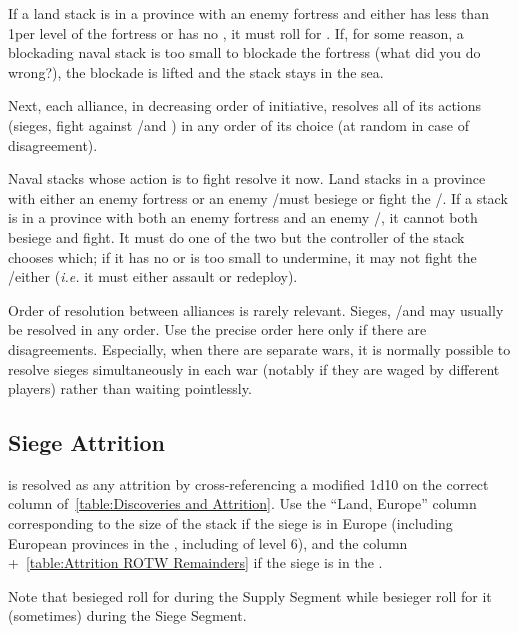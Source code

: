 If a land stack is in a province with an enemy fortress and either has less
than 1\LD per level of the fortress or has no \LoS , it must roll for
. If, for some reason, a blockading naval stack is too
small to blockade the fortress (what did you do wrong?), the blockade is
lifted and the stack stays in the sea.

Next, each alliance, in decreasing order of initiative, resolves all of its
actions (sieges, fight against \REVOLT/\REBELLION and \corsaire) in any order
of its choice (at random in case of disagreement).

Naval stacks whose action is to fight \corsaire resolve it now. Land stacks in
a province with either an enemy fortress or an enemy \REVOLT/\REBELLION must
besiege or fight the \REVOLT/\REBELLION. If a stack is in a province with both
an enemy fortress and an enemy \REVOLT/\REBELLION, it cannot both besiege and
fight. It must do one of the two but the controller of the stack chooses
which; if it has no \LoS or is too small to undermine, it may not fight the
\REVOLT/\REBELLION either (\emph{i.e.} it must either assault or redeploy).

\begin{designnote}
  Order of resolution between alliances is rarely relevant. Sieges,
  \REVOLT/\REBELLION and \corsaire may usually be resolved in any order. Use
  the precise order here only if there are disagreements. Especially, when
  there are separate wars, it is normally possible to resolve sieges
  simultaneously in each war (notably if they are waged by different players)
  rather than waiting pointlessly.
\end{designnote}

\subsection{Siege Attrition}
 is resolved as any attrition by cross-referencing a
modified 1d10 on the correct column of~\ref{table:Discoveries and
  Attrition}. Use the ``Land, Europe'' column corresponding to the size of the
stack if the siege is in Europe (including European provinces in the \ROTW,
including \COL of level 6), and the \ROTW column +~\ref{table:Attrition ROTW
  Remainders} if the siege is in the \ROTW.

Note that besieged roll for  during the Supply Segment
while besieger roll for it (sometimes) during the Siege Segment.

